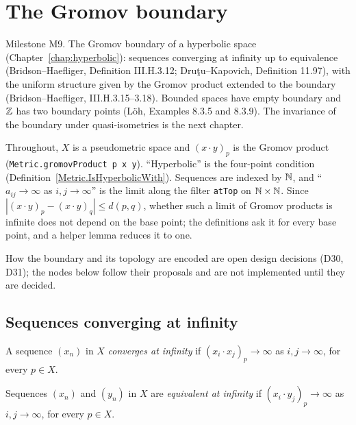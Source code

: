 \chapter{The Gromov boundary}
\label{chap:gromov-boundary}

Milestone M9. The Gromov boundary of a hyperbolic space (Chapter~\ref{chap:hyperbolic}): sequences
converging at infinity up to equivalence (Bridson--Haefliger, Definition III.H.3.12;
Dru\c{t}u--Kapovich, Definition 11.97), with the uniform structure given by the Gromov product
extended to the boundary (Bridson--Haefliger, III.H.3.15--3.18). Bounded spaces have empty
boundary and $\mathbb{Z}$ has two boundary points (L\"oh, Examples 8.3.5 and 8.3.9). The invariance of
the boundary under quasi-isometries is the next chapter.

Throughout, $X$ is a pseudometric space and $(x \cdot y)_p$ is the Gromov product
(\texttt{Metric.gromovProduct p x y}). ``Hyperbolic'' is the four-point condition
(Definition~\ref{Metric.IsHyperbolicWith}). Sequences are indexed by $\mathbb{N}$, and ``$a_{ij} \to \infty$
as $i, j \to \infty$'' is the limit along the filter \texttt{atTop} on $\mathbb{N} \times \mathbb{N}$. Since
$|(x \cdot y)_p - (x \cdot y)_q| \le d(p, q)$, whether such a limit of Gromov products is infinite
does not depend on the base point; the definitions ask it for every base point, and a helper lemma
reduces it to one.

How the boundary and its topology are encoded are open design decisions (D30, D31); the nodes
below follow their proposals and are not implemented until they are decided.

\section*{Sequences converging at infinity}

\begin{definition}
  \label{Metric.ConvergesAtInfinity}
  A sequence $(x_n)$ in $X$ \emph{converges at infinity} if $(x_i \cdot x_j)_p \to \infty$ as
  $i, j \to \infty$, for every $p \in X$.
\end{definition}

\begin{definition}
  \label{Metric.EquivAtInfinity}
  Sequences $(x_n)$ and $(y_n)$ in $X$ are \emph{equivalent at infinity} if
  $(x_i \cdot y_j)_p \to \infty$ as $i, j \to \infty$, for every $p \in X$.
\end{definition}

